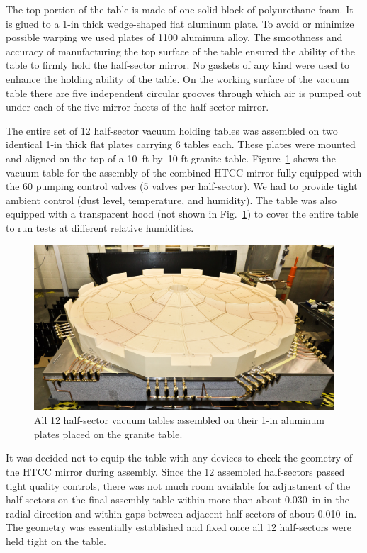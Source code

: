 The top portion of the table is made of one solid block of polyurethane foam. It is glued to a 1-in thick
wedge-shaped flat aluminum plate. To avoid or minimize possible warping we used plates of 1100 aluminum
alloy. The smoothness and accuracy of manufacturing the top surface of the table ensured the ability of the
table to firmly hold the half-sector mirror. No gaskets of any kind were used to enhance the holding ability of
the table. On the working surface of the vacuum table there are five independent circular grooves through
which air is pumped out under each of the five mirror facets of the half-sector mirror. 

The entire set of 12 half-sector vacuum holding tables was assembled on two identical 1-in thick flat plates
carrying 6 tables each. These plates were mounted and aligned on the top of a 10~ft by~10 ft granite table.
Figure~\ref{fig:Twelve_Foam_Vacuum_Tables} shows the vacuum table for the assembly of the combined
HTCC mirror fully equipped with the 60 pumping control valves (5 valves per half-sector). We had to provide
tight ambient control (dust level, temperature, and humidity). The table was also equipped with a transparent
hood (not shown in Fig.~\ref{fig:Twelve_Foam_Vacuum_Tables}) to cover the entire table to run tests at
different relative humidities.   

\begin{figure}[ht]
    \centering
    \includegraphics[width=1.0\linewidth]{images/Twelve_Foam_Vacuum_Tables.jpg}
    \caption{All 12 half-sector vacuum tables assembled on their 1-in aluminum plates placed on the granite table.}
    \label{fig:Twelve_Foam_Vacuum_Tables}
\end{figure}

It was decided not to equip the table with any devices to check the geometry of the HTCC mirror during assembly.
Since the 12 assembled half-sectors passed tight quality controls, there was not much room available for adjustment
of the half-sectors on the final assembly table within more than about 0.030~in in the radial direction and within gaps
between adjacent half-sectors of about 0.010~in. The geometry was essentially established and fixed once all 12
half-sectors were held tight on the table.

